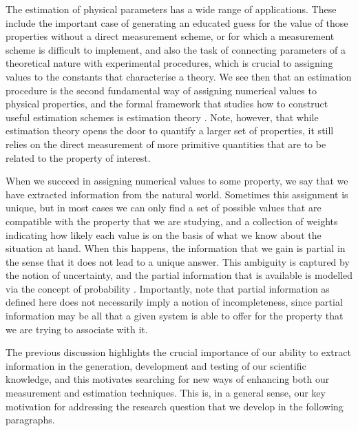 The estimation of physical parameters has a wide range of applications. These include the important case of generating an educated guess for the value of those properties without a direct measurement scheme, or for which a measurement scheme is difficult to implement, and also the task of connecting parameters of a theoretical nature with experimental procedures, which is crucial to assigning values to the constants that characterise a theory. We see then that an estimation procedure is the second fundamental way of assigning numerical values to physical properties, and the formal framework that studies how to construct useful estimation schemes is estimation theory \cite{helstrom1976, jaynes2003, kay1993}. Note, however, that while estimation theory opens the door to quantify a larger set of properties, it still relies on the direct measurement of more primitive quantities that are to be related to the property of interest. 

When we succeed in assigning numerical values to some property, we say that we have extracted information from the natural world. Sometimes this assignment is unique, but in most cases we can only find a set of possible values that are compatible with the property that we are studying, and a collection of weights indicating how likely each value is on the basis of what we know about the situation at hand. When this happens, the information that we gain is partial in the sense that it does not lead to a unique answer. This ambiguity is captured by the notion of uncertainty, and the partial information that is available is modelled via the concept of probability \cite{jaynes2003}. Importantly, note that partial information as defined here does not necessarily imply a notion of incompleteness, since partial information may be all that a given system is able to offer for the property that we are trying to associate with it. 

The previous discussion highlights the crucial importance of our ability to extract information in the generation, development and testing of our scientific knowledge, and this motivates searching for new ways of enhancing both our measurement and estimation techniques. This is, in a general sense, our key motivation for addressing the research question that we develop in the following paragraphs.  

